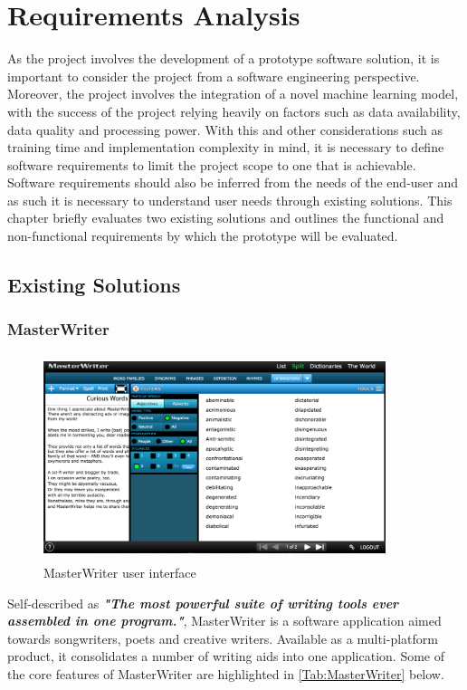 \chapter{Requirements Analysis}
\label{chap:requirements_analysis}
As the project involves the development of a prototype software solution, it is important to consider the project from a software engineering perspective. Moreover, the project involves the integration of a novel machine learning model, with the success of the project relying heavily on factors such as data availability, data quality and processing power. With this and other considerations such as training time and implementation complexity in mind, it is necessary to define software requirements to limit the project scope to one that is achievable. Software requirements should also be inferred from the needs of the end-user and as such it is necessary to understand user needs through existing solutions. This chapter briefly evaluates two existing solutions and outlines the functional and non-functional requirements by which the prototype will be evaluated.
\section{Existing Solutions}
\subsection{MasterWriter}
\begin{figure}[h]
	\includegraphics[width=10cm, height=6cm]{./figures/fig9}
	\centering
	\caption[MasterWriter]{MasterWriter user interface}
	\label{fig:fig9}
\end{figure}
\noindent
Self-described as \textbf{\textit{"The most powerful suite of writing tools ever assembled in one program."}}, MasterWriter is a software application aimed towards songwriters, poets and creative
writers. Available as a multi-platform product, it consolidates a number of writing aids into one application. Some of the core features of MasterWriter are highlighted in \autoref{Tab:MasterWriter} below.

